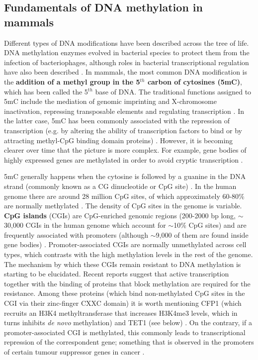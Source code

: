 \smallskip

\subsection{Fundamentals of DNA methylation in mammals} \label{s:1.2.2}

\smallskip

Different types of DNA modifications have been described across the tree of life. DNA methylation enzymes evolved in bacterial species to protect them from the infection of bacteriophages, although roles in bacterial transcriptional regulation have also been described  \cite{Sanchez-Romero2015}. In mammals, the most common DNA modification is the \textbf{addition of a methyl group in the 5$^{th}$ carbon of cytosines (\acrshort{5mC})}, which has been called the 5$^{th}$ base of DNA. The traditional functions assigned to 5mC include the mediation of genomic imprinting and X-chromosome inactivation, repressing transposable elements and regulating transcription \cite{Wu2017}. In the latter case, 5mC has been commonly associated with the repression of transcription (e.g. by altering the ability of transcription factors to bind or by attracting methyl-CpG binding domain proteins) \cite{Li2014}. However, it is becoming clearer over time that the picture is more complex. For example, gene bodies of highly expressed genes are methylated in order to avoid cryptic transcription \cite{Neri2017}.

\bigskip

5mC generally happens when the cytosine is followed by a guanine in the DNA strand (commonly known as a CG dinucleotide or CpG site) \cite{Li2014,Smith2013}. In the human genome there are around 28 million CpG sites, of which approximately 60-80\% are normally methylated \cite{Smith2013}. The density of CpG sites in the genome is variable. \textbf{CpG islands} (\acrshort{CGI}s) are CpG-enriched genomic regions (200-2000 bp long, $\sim$30,000 CGIs in the human genome which account for $\sim$10\% CpG sites) and are frequently associated with promoters (although $\sim$9,000 of them are found inside gene bodies) \cite{Smith2013,Jeziorska2017,Zeng2014}. Promoter-associated CGIs are normally unmethylated across cell types, which contrasts with the high methylation levels in the rest of the genome. The mechanism by which these CGIs remain resistant to DNA methylation is starting to be elucidated. Recent reports suggest that active transcription together with the binding of proteins that block methylation are required for the resistance. Among these proteins (which bind non-methylated CpG sites in the CGI via their zinc-finger CXXC domain) it is worth mentioning CFP1 (which recruits an H3K4 methyltransferase that increases H3K4me3 levels, which in turns inhibits \textit{de novo} methylation) and TET1 (see below) \cite{Takahashi2017}. On the contrary, if a promoter-associated CGI is methylated, this commonly leads to transcriptional repression of the correspondent gene; something that is observed in the promoters of certain tumour suppressor genes in cancer \cite{Flavahan2017}. 

